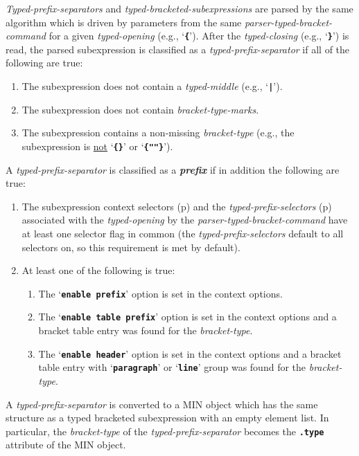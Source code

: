 \documentclass[12pt]{article}
\newcommand{\TT}[1]{{\tt \bfseries #1}}
\newcommand{\key}[1]{{\bf \em #1}\index{#1}}
\newcommand{\pagref}[1]{p\pageref{#1}}
\begin{document}
{\em Typed-prefix-separators} and {\em typed-bracketed-subexpressions}
are parsed by the same algorithm which is driven by parameters from
the same {\em parser-typed-bracket-command} for a given {\em typed-opening}
(e.g., `\TT{\{}').
After the {\em typed-closing}
(e.g., `\TT{\}}') is read, the parsed subexpression is classified as
a {\em typed-prefix-separator} if all of the following are true:
\begin{enumerate}
\item The subexpression does not contain a {\em typed-middle} (e.g., `\TT{|}'). 
\item The subexpression does not contain {\em bracket-type-marks}.
\item The subexpression contains a non-missing
      {\em bracket-type} (e.g., the subexpression is \underline{not}
      `\TT{\{\}}' or `\TT{\{""\}}').
\setcounter{PREFIX-COUNTER}{\value{enumi}}
\end{enumerate}
A {\em typed-prefix-separator} is classified as a \key{prefix}\label{PREFIX}
if in addition the following are true:
\begin{enumerate}
\setcounter{enumi}{\value{PREFIX-COUNTER}}
\item\label{TYPED-PREFIX-SELECTORS-USE}
The subexpression context selectors (\pagref{CONTEXT-SELECTORS})
and the {\em typed-prefix-selectors} (\pagref{TYPED-PREFIX-SELECTORS})
associated with the {\em typed-opening} by the
{\em parser-typed-bracket-command} have at least one selector flag in
common (the {\em typed-prefix-selectors} default to all selectors on,
so this requirement is met by default).
\item At least one of the following is true:
\begin{enumerate}
\item The `\TT{enable prefix}' option is set in the context options.
\item The `\TT{enable table prefix}' option is set in the context options
      and a bracket table entry was found for the {\em bracket-type}.
\item The `\TT{enable header}' option is set in the context options
      and a bracket table entry with `\TT{paragraph}' or `\TT{line}'
      group was found for the {\em bracket-type}.
\end{enumerate}
\end{enumerate}

A {\em typed-prefix-separator} is converted to a MIN object which has the
same structure as a typed bracketed subexpression with an empty element list.
In particular, the {\em bracket-type} of the {\em typed-prefix-separator}
becomes the \TT{.type} attribute of the MIN object.
\end{document}

